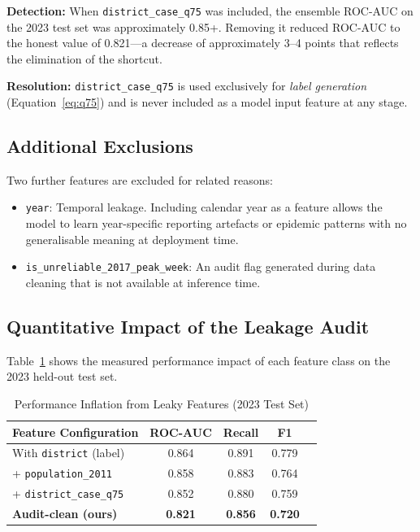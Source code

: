 \documentclass[conference]{IEEEtran}
\begin{document}
\textbf{Detection:} When \texttt{district\_case\_q75} was included,
the ensemble ROC-AUC on the 2023 test set was approximately 0.85+.
Removing it reduced ROC-AUC to the honest value of 0.821---a
decrease of approximately 3--4 points that reflects the elimination
of the shortcut.

\textbf{Resolution:} \texttt{district\_case\_q75} is used
exclusively for \emph{label generation} (Equation~\ref{eq:q75})
and is never included as a model input feature at any stage.

\subsection{Additional Exclusions}

Two further features are excluded for related reasons:

\begin{itemize}
  \item \texttt{year}: Temporal leakage. Including calendar year
    as a feature allows the model to learn year-specific reporting
    artefacts or epidemic patterns with no generalisable meaning
    at deployment time.
  \item \texttt{is\_unreliable\_2017\_peak\_week}: An audit flag
    generated during data cleaning that is not available at
    inference time.
\end{itemize}

\subsection{Quantitative Impact of the Leakage Audit}

Table~\ref{tab:leakage} shows the measured performance impact of
each feature class on the 2023 held-out test set.

\begin{table}[htbp]
  \caption{Performance Inflation from Leaky Features (2023 Test Set)}
  \label{tab:leakage}
  \centering
  \renewcommand{\arraystretch}{1.15}
  \setlength{\tabcolsep}{5pt}
  \begin{tabular}{lcccc}
    \toprule
    \textbf{Feature Configuration} &
    \textbf{ROC-AUC} & \textbf{Recall} & \textbf{F1} \\
    \midrule
    With \texttt{district} (label)         & 0.864 & 0.891 & 0.779 \\
    + \texttt{population\_2011}            & 0.858 & 0.883 & 0.764 \\
    + \texttt{district\_case\_q75}         & 0.852 & 0.880 & 0.759 \\
    \textbf{Audit-clean (ours)}            & \textbf{0.821} &
                                             \textbf{0.856} &
                                             \textbf{0.720} \\
    \bottomrule
  \end{tabular}
\end{table}
\end{document}
